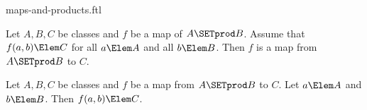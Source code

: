 \documentclass{stex}
\begin{document}
\begin{smodule}{maps-and-products.ftl}

\begin{proposition}[forthel,id=FOUNDATIONS_06_2754759509409792]
  Let $A, B, C$ be classes and $f$ be a map of $A \SETprod B$.
  Assume that $f(a,b) \Elem C$ for all $a \Elem A$ and all $b \Elem B$.
  Then $f$ is a map from $A \SETprod B$ to $C$.
\end{proposition}

\begin{proposition}[forthel,id=FOUNDATIONS_06_2304295212941312]
  Let $A, B, C$ be classes and $f$ be a map from $A \SETprod B$ to $C$.
  Let $a \Elem A$ and $b \Elem B$.
  Then $f(a,b) \Elem C$.
\end{proposition}
\end{smodule}
\end{document}
